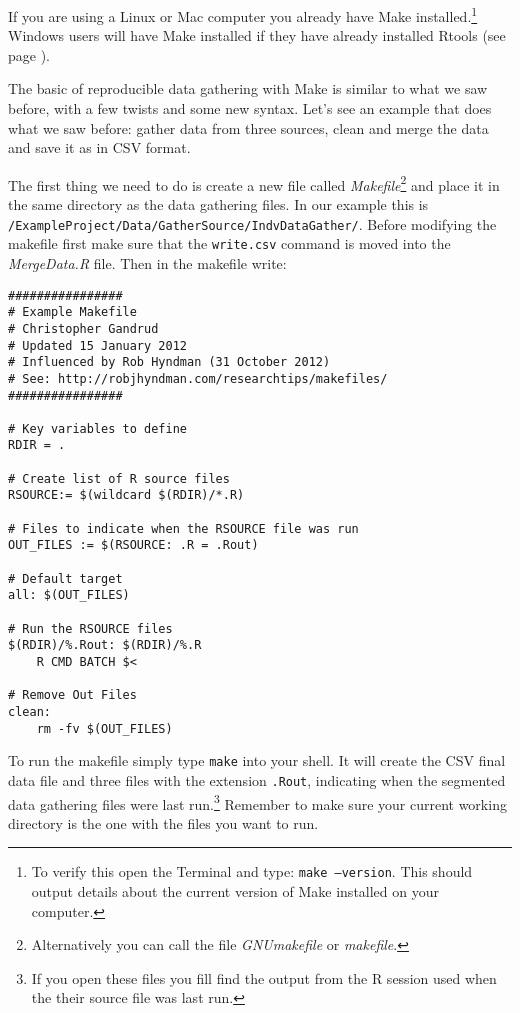 If you are using a Linux or Mac computer you already have Make installed.\footnote{To verify this open the Terminal and type: \texttt{make --version}. This should output details about the current version of Make installed on your computer.} Windows users will have Make installed if they have already installed Rtools (see page \pageref{RtoolsDownload}).

The basic of reproducible data gathering with Make is similar to what we saw before, with a few twists and some new syntax. Let's see an example that does what we saw before: gather data from three sources, clean and merge the data and save it as in CSV format. 

The first thing we need to do is create a new file called \emph{Makefile}\footnote{Alternatively you can call the file \emph{GNUmakefile} or \emph{makefile}.} and place it in the same directory as the data gathering files. In our example this is \texttt{/ExampleProject/Data/GatherSource/IndvDataGather/}. Before modifying the makefile first make sure that the \texttt{write.csv} command is moved into the \emph{MergeData.R} file. Then in the makefile write:

\begin{knitrout}
	\color{fgcolor}
	\begin{kframe}
		\begin{verbatim}
################
# Example Makefile
# Christopher Gandrud
# Updated 15 January 2012
# Influenced by Rob Hyndman (31 October 2012)
# See: http://robjhyndman.com/researchtips/makefiles/
################

# Key variables to define
RDIR = .

# Create list of R source files
RSOURCE:= $(wildcard $(RDIR)/*.R)

# Files to indicate when the RSOURCE file was run
OUT_FILES := $(RSOURCE: .R = .Rout)

# Default target
all: $(OUT_FILES) 

# Run the RSOURCE files
$(RDIR)/%.Rout: $(RDIR)/%.R
	R CMD BATCH $<

# Remove Out Files
clean: 
	rm -fv $(OUT_FILES)
			\end{verbatim}
		\end{kframe}
\end{knitrout}


\noindent To run the makefile simply type \texttt{make} into your shell. It will create the CSV final data file and three files with the extension \texttt{.Rout}, indicating when the segmented data gathering files were last run.\footnote{If you open these files you fill find the output from the R session used when the their source file was last run.} Remember to make sure your current working directory is the one with the files you want to run.

